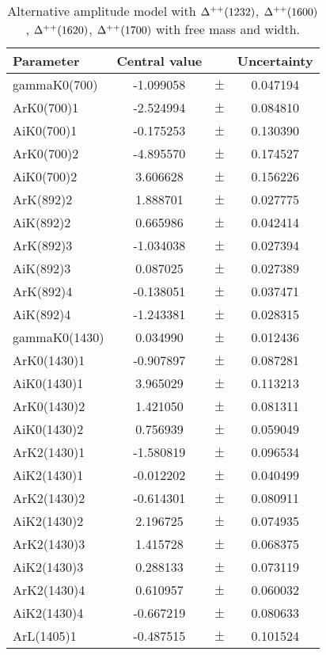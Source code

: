 \clearpage

\begin{table}
\centering
\caption{Alternative amplitude model with ${\Delta}^{++}(1232)$, ${\Delta}^{++}(1600)$, ${\Delta}^{++}(1620)$, ${\Delta}^{++}(1700)$ with free mass and width.\label{tab:alternative_first}}
\begin{tiny}
\begin{tabular}{lccc}
\toprule
Parameter & Central value & & Uncertainty\\
\midrule
gammaK0(700) & -1.099058 & $\pm$ & 0.047194 \\
ArK0(700)1 & -2.524994 & $\pm$ & 0.084810 \\
AiK0(700)1 & -0.175253 & $\pm$ & 0.130390 \\
ArK0(700)2 & -4.895570 & $\pm$ & 0.174527 \\
AiK0(700)2 & 3.606628 & $\pm$ & 0.156226 \\
ArK(892)2 & 1.888701 & $\pm$ & 0.027775 \\
AiK(892)2 & 0.665986 & $\pm$ & 0.042414 \\
ArK(892)3 & -1.034038 & $\pm$ & 0.027394 \\
AiK(892)3 & 0.087025 & $\pm$ & 0.027389 \\
ArK(892)4 & -0.138051 & $\pm$ & 0.037471 \\
AiK(892)4 & -1.243381 & $\pm$ & 0.028315 \\
gammaK0(1430) & 0.034990 & $\pm$ & 0.012436 \\
ArK0(1430)1 & -0.907897 & $\pm$ & 0.087281 \\
AiK0(1430)1 & 3.965029 & $\pm$ & 0.113213 \\
ArK0(1430)2 & 1.421050 & $\pm$ & 0.081311 \\
AiK0(1430)2 & 0.756939 & $\pm$ & 0.059049 \\
ArK2(1430)1 & -1.580819 & $\pm$ & 0.096534 \\
AiK2(1430)1 & -0.012202 & $\pm$ & 0.040499 \\
ArK2(1430)2 & -0.614301 & $\pm$ & 0.080911 \\
AiK2(1430)2 & 2.196725 & $\pm$ & 0.074935 \\
ArK2(1430)3 & 1.415728 & $\pm$ & 0.068375 \\
AiK2(1430)3 & 0.288133 & $\pm$ & 0.073119 \\
ArK2(1430)4 & 0.610957 & $\pm$ & 0.060032 \\
AiK2(1430)4 & -0.667219 & $\pm$ & 0.080633 \\
ArL(1405)1 & -0.487515 & $\pm$ & 0.101524 \\

\end{tabular}
\end{tiny}
\end{table}
